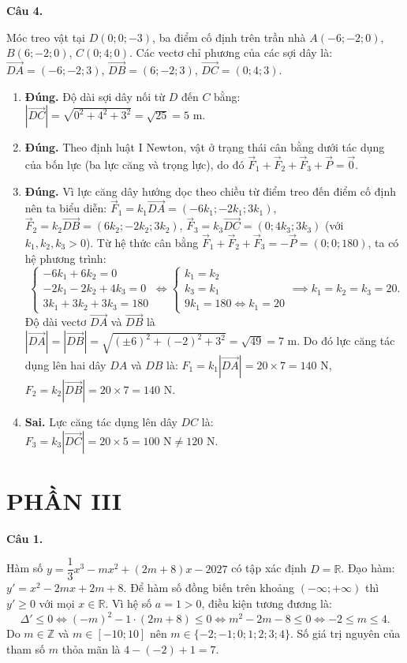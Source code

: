 \documentclass[12pt,a4paper]{article}
\newcommand{\loigiai}[1]{\par\medskip\Needspace{4\baselineskip}\noindent\textbf{#1}\par\nobreak}
\begin{document}
\loigiai{Câu 4.}
Móc treo vật tại $D(0;0;-3)$, ba điểm cố định trên trần nhà $A(-6;-2;0)$, $B(6;-2;0)$, $C(0;4;0)$.
Các vectơ chỉ phương của các sợi dây là:
$\vec{DA} = (-6;-2;3)$, $\vec{DB} = (6;-2;3)$, $\vec{DC} = (0;4;3)$.
\begin{enumerate}
\item \textbf{Đúng.} Độ dài sợi dây nối từ $D$ đến $C$ bằng:
$|\vec{DC}| = \sqrt{0^2+4^2+3^2} = \sqrt{25} = 5\text{ m}$.
\item \textbf{Đúng.} Theo định luật I Newton, vật ở trạng thái cân bằng dưới tác dụng của bốn lực (ba lực căng và trọng lực), do đó $\vec{F}_1+\vec{F}_2+\vec{F}_3+\vec{P}=\vec{0}$.
\item \textbf{Đúng.} Vì lực căng dây hướng dọc theo chiều từ điểm treo đến điểm cố định nên ta biểu diễn:
$\vec{F}_1 = k_1\vec{DA} = (-6k_1; -2k_1; 3k_1)$,
$\vec{F}_2 = k_2\vec{DB} = (6k_2; -2k_2; 3k_2)$,
$\vec{F}_3 = k_3\vec{DC} = (0; 4k_3; 3k_3)$ (với $k_1, k_2, k_3 > 0$).
Từ hệ thức cân bằng $\vec{F}_1+\vec{F}_2+\vec{F}_3 = -\vec{P} = (0;0;180)$, ta có hệ phương trình:
\[
\begin{cases}
-6k_1 + 6k_2 = 0\\
-2k_1 - 2k_2 + 4k_3 = 0\\
3k_1 + 3k_2 + 3k_3 = 180
\end{cases}
\iff
\begin{cases}
k_1 = k_2\\
k_3 = k_1\\
9k_1 = 180 \iff k_1 = 20
\end{cases}
\implies k_1 = k_2 = k_3 = 20.
\]
Độ dài vectơ $\vec{DA}$ và $\vec{DB}$ là $|\vec{DA}|=|\vec{DB}|=\sqrt{(\pm 6)^2+(-2)^2+3^2}=\sqrt{49}=7\text{ m}$.
Do đó lực căng tác dụng lên hai dây $DA$ và $DB$ là:
$F_1 = k_1 |\vec{DA}| = 20\times 7 = 140\text{ N}$, $F_2 = k_2 |\vec{DB}| = 20\times 7 = 140\text{ N}$.
\item \textbf{Sai.} Lực căng tác dụng lên dây $DC$ là:
$F_3 = k_3 |\vec{DC}| = 20\times 5 = 100\text{ N}\ne 120\text{ N}$.
\end{enumerate}

\section*{PHẦN III}

\loigiai{Câu 1.}
Hàm số $y=\dfrac{1}{3}x^3-mx^2+(2m+8)x-2027$ có tập xác định $D=\mathbb{R}$.
Đạo hàm: $y'=x^2-2mx+2m+8$.
Để hàm số đồng biến trên khoảng $(-\infty;+\infty)$ thì $y'\ge 0$ với mọi $x\in\mathbb{R}$.
Vì hệ số $a=1>0$, điều kiện tương đương là:
\[
\Delta' \le 0 \iff (-m)^2 - 1\cdot(2m+8) \le 0 \iff m^2-2m-8 \le 0 \iff -2 \le m \le 4.
\]
Do $m\in\mathbb{Z}$ và $m\in[-10;10]$ nên $m\in\{-2;-1;0;1;2;3;4\}$.
Số giá trị nguyên của tham số $m$ thỏa mãn là $4 - (-2) + 1 = 7$.
\end{document}

